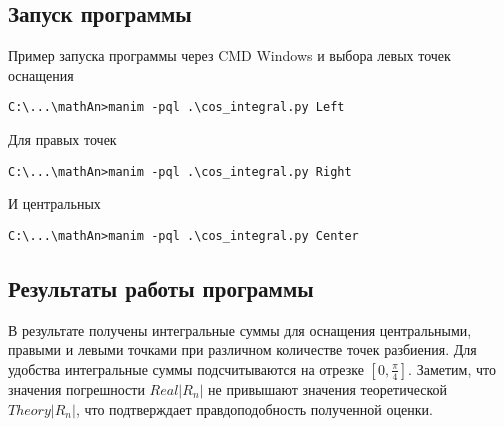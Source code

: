 \documentclass[a5paper, 10pt]{article}
\theoremstyle{definition}
\theoremstyle{plain}
\theoremstyle{remark}
\begin{document}
\subsection{Запуск программы}
Пример запуска программы через CMD Windows и выбора левых точек оснащения
\begin{lstlisting}
C:\...\mathAn>manim -pql .\cos_integral.py Left
\end{lstlisting}
Для правых точек
\begin{lstlisting}
C:\...\mathAn>manim -pql .\cos_integral.py Right
\end{lstlisting}
И центральных
\begin{lstlisting}
C:\...\mathAn>manim -pql .\cos_integral.py Center
\end{lstlisting}
\subsection{Результаты работы программы}
В результате получены интегральные суммы для оснащения центральными, правыми и левыми точками при различном количестве точек разбиения. Для удобства интегральные суммы подсчитываются на отрезке  $[0, \frac{\pi}{4}]$. Заметим, что значения погрешности $Real \left|R_n \right|$ не привышают значения теоретической $Theory \left|R_n \right|$, что подтверждает правдоподобность полученной оценки.
\end{document}
